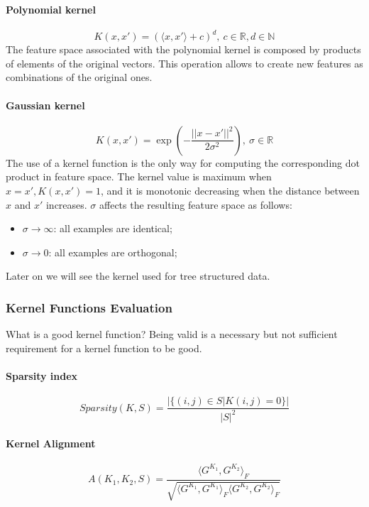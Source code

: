 \paragraph{Polynomial kernel}
\begin{equation}
	K(x, x') = (\langle x, x' \rangle + c)^d, \ c \in \mathbb{R}, d \in \mathbb{N}
\end{equation}
The feature space associated with the polynomial kernel is composed by products
of elements of the original vectors. This operation allows to create new
features as combinations of the original ones.

\paragraph{Gaussian kernel}
\begin{equation}
	K(x, x') = \exp\left(-\frac{||x - x'||^2}{2\sigma^2}\right), \ 
	\sigma \in \mathbb{R}
\end{equation}
The use of a kernel function is the only way for computing the corresponding
dot product in feature space. The kernel value is maximum when $x = x', K(x, x')
= 1$, and it is monotonic decreasing when the distance between $x$ and $x'$
increases. $\sigma$ affects the resulting feature space as follows:
\begin{itemize}
	\item $\sigma \rightarrow \infty$: all examples are identical;
	\item $\sigma \rightarrow 0$: all examples are orthogonal;
\end{itemize}

Later on we will see the kernel used for tree structured data.

\subsubsection{Kernel Functions Evaluation}

What is a good kernel function? Being valid is a necessary but not sufficient
requirement for a kernel function to be good. 

\paragraph{Sparsity index}
\begin{equation}
	Sparsity(K, S) = \frac{|\{(i, j) \in S | K(i, j) = 0\}|}{|S|^2}
\end{equation}

\paragraph{Kernel Alignment}
\begin{equation}
	\label{kernel_alignment}
	A(K_1, K_2, S) = \frac{\langle G^{K_1}, G^{K_2} \rangle_F}
	{\sqrt{\langle G^{K_1}, G^{K_1} \rangle_F \langle G^{K_2}, G^{K_2} \rangle_F}}
\end{equation}

